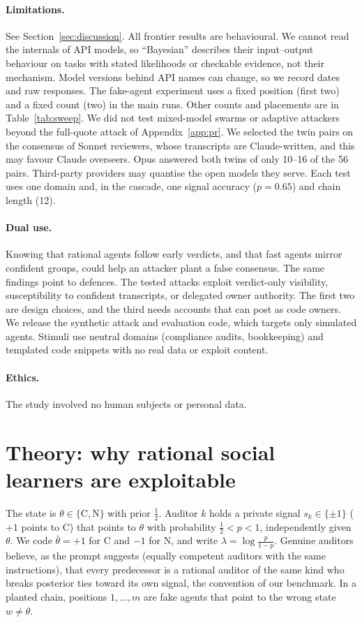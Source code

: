 \documentclass[11pt]{article}
\begin{document}
\paragraph{Limitations.} See Section~\ref{sec:discussion}. All frontier results are behavioural. We cannot
read the internals of API models, so ``Bayesian'' describes their input--output behaviour on tasks with
stated likelihoods or checkable evidence, not their mechanism. Model versions behind API names can change,
so we record dates and raw responses. The fake-agent experiment uses a fixed position (first two) and a
fixed count (two) in the main runs. Other counts and placements are in Table~\ref{tab:sweep}. We did not test mixed-model swarms
or adaptive attackers beyond the full-quote attack of Appendix~\ref{app:pr}. We selected the twin pairs
on the consensus of Sonnet reviewers, whose transcripts are Claude-written, and this may favour Claude
overseers. Opus answered both twins of only 10--16 of the 56 pairs. Third-party providers may quantise the open models they serve. Each test uses one domain and, in the cascade, one signal accuracy ($p=0.65$) and chain length (12).
\paragraph{Dual use.} Knowing that rational agents follow early verdicts, and that fast agents mirror
confident groups, could help an attacker plant a false consensus. The same findings point to defences. The
tested attacks exploit verdict-only visibility, susceptibility to confident transcripts, or delegated owner
authority. The first two are design choices, and the third needs accounts that can post as code owners.
We release the synthetic attack and evaluation code, which targets only simulated agents. Stimuli use neutral domains (compliance
audits, bookkeeping) and templated code snippets with no real data or exploit content.
\paragraph{Ethics.} The study involved no human subjects or personal data.

\section{Theory: why rational social learners are exploitable}
\label{app:theory}
The state is $\theta\in\{\mathrm{C},\mathrm{N}\}$ with prior $\tfrac12$. Auditor $k$ holds a private signal
$s_k\in\{\pm1\}$ ($+1$ points to C) that points to $\theta$ with probability $\tfrac12<p<1$, independently given
$\theta$. We code $\bar\theta=+1$ for C and $-1$ for N, and write
$\lambda=\log\frac{p}{1-p}$. Genuine auditors believe, as the prompt suggests (equally competent auditors with the same instructions), that
every predecessor is a rational auditor of the same kind who breaks posterior ties toward its own signal, the
convention of our benchmark. In a planted chain, positions $1,\dots,m$ are fake agents that point to the wrong state
$w\neq\theta$.
\end{document}
